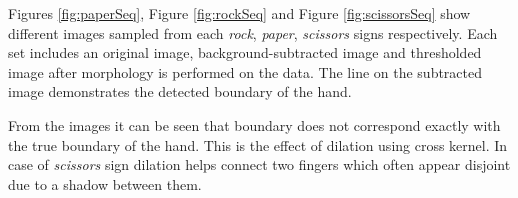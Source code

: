 \graphicspath{{./results/}}
Figures \ref{fig:paperSeq}, Figure \ref{fig:rockSeq} and Figure \ref{fig:scissorsSeq} show different images sampled from each \textit{rock}, \textit{paper}, \textit{scissors} signs respectively. Each set includes an original image, background-subtracted image and thresholded image after morphology is performed on the data. The line on the subtracted image demonstrates the detected boundary of the hand.

From the images it can be seen that boundary does not correspond exactly with the true boundary of the hand. This is the effect of dilation using cross kernel. In case of \textit{scissors} sign dilation helps connect two fingers which often appear disjoint due to a shadow between them.

\begin{figure}[htp]
\begin{center}
    \\

\end{center}
\end{figure}
